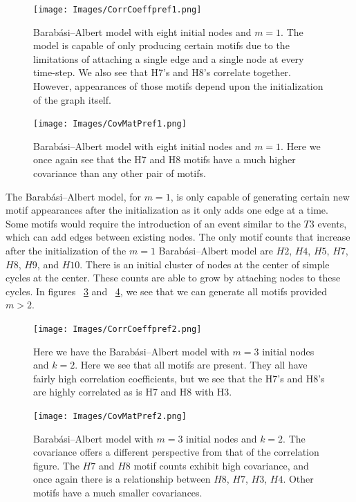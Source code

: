 \begin{figure}
    \texttt{[image: Images/CorrCoeffpref1.png]}\
    \centering
    \caption{Barabási–Albert model with eight initial nodes and $m=1$. The model
     is capable of only producing certain motifs due to the limitations of 
    attaching a single edge and a single node at every time-step. We also see that 
    H7's and H8's correlate together. However, appearances of those motifs depend upon the initialization
     of the graph itself.}
     \label{fig:BAcorr1}
\end{figure}

\begin{figure}
    \texttt{[image: Images/CovMatPref1.png]}\
    \centering
    \caption{Barabási–Albert model with eight initial nodes and $m =1$. Here we once again see that 
    the H7 and H8 motifs have a much higher covariance than any other pair of motifs.}
    \label{fig:BAcov1}
\end{figure}


The Barabási–Albert model, for $m=1$, is only capable of generating certain new motif appearances after the initialization as 
it only adds one edge at a time. Some motifs would require the introduction of an event similar to the $T3$ events,
which can add edges between existing nodes. The only motif counts that increase after the initialization
 of the $m=1$ Barabási–Albert model are $H2$, $H4$, $H5$, $H7$, $H8$, $H9$, and $H10$. There is an initial cluster
of nodes at the center of simple cycles at the center. These counts are able to grow by attaching nodes to these cycles.
In figures  ~\ref{fig:BA2corr} and ~\ref{fig:BA2coeff}, we see that we can generate all motifs provided
$m>2$.


\begin{figure}
    \texttt{[image: Images/CorrCoeffpref2.png]}\
    \centering
    \caption{Here we have the Barabási–Albert model with $m=3$ initial nodes and $k=2$. Here we see that all motifs 
    are present. They all have fairly high correlation coefficients, but we see that the H7's and
    H8's are highly correlated as is H7 and H8 with H3.}
    \label{fig:BA2corr}
\end{figure}

\begin{figure}
    \texttt{[image: Images/CovMatPref2.png]}\
    \centering
    \caption{Barabási–Albert model with $m=3$ initial nodes and $k=2$. The covariance
    offers a different perspective from that of the correlation figure. The
     $H7$ and $H8$ motif counts exhibit high covariance, and once again there is a relationship
    between $H8$, $H7$, $H3$, $H4$. Other motifs have a much smaller covariances.}
    \label{fig:BA2coeff}
\end{figure}

